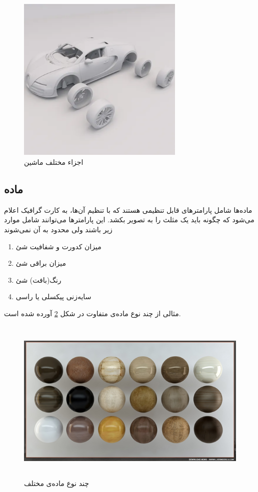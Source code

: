 \begin{figure}[ht]
	\centerline{\includegraphics[width=\textwidth,height=8cm,keepaspectratio]{Figures/Ch2/Car.png}}

	\caption{اجزاء مختلف ماشین\cite{CarSource}}
	\label{fig:Car}
\end{figure}

\subsection{ماده 
\protect{}
}
ماده‌ها شامل پارامتر‌های قابل تنظیمی هستند که با تنظیم آن‌ها، به کارت گرافیک اعلام می‌شود که چگونه باید یک مثلث را به تصویر بکشد.
این پارامترها می‌توانند شامل موارد زیر باشند ولی محدود به آن نمی‌شوند

\begin{enumerate}
	\item میزان کدورت و شفافیت شئ
 	\item میزان براقی شئ
 	\item رنگ(بافت) شئ
 	\item سایه‌زنی پیکسلی یا راسی \protect{}
\end{enumerate}

مثالی از چند نوع ماده‌ی متفاوت در شکل 
\ref{fig:Material}
آورده‌ شده است.

\begin{figure}[ht]
	\centerline{\includegraphics[width=\textwidth,height=8cm,keepaspectratio]{Figures/Ch2/Material.png}}

	\caption{چند نوع ماده‌ی مختلف\cite{MaterialSource}}
	\label{fig:Material}
\end{figure}


